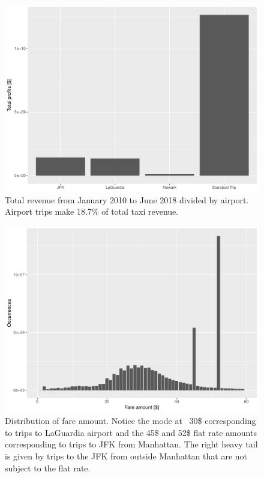 \documentclass{acm_proc_article-sp-sigmod09}
\begin{document}
\begin{figure}
	\centering
	\includegraphics[width=1\columnwidth]{resources/airport/total_amount_by_airport.pdf}
	\caption{Total revenue from January 2010 to June 2018 divided by airport. Airport trips make 18.7\% of total taxi revenue.}
	\label{fig:airportProfitDistr}
\end{figure}

\begin{figure}
	\centering
	\includegraphics[width=1\columnwidth]{resources/airport/fare_amount_distr.pdf}
	\caption{Distribution of fare amount. Notice the mode at ~30\$ corresponding to trips to LaGuardia airport and the 45\$ and 52\$ flat rate amounts corresponding to trips to JFK from Manhattan. The right heavy tail is given by trips to the JFK from outside Manhattan that are not subject to the flat rate.}
	\label{fig:airportFareAmount}
\end{figure}
\end{document}
